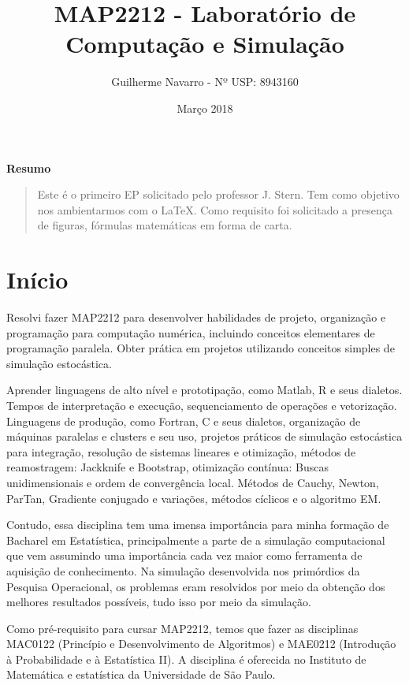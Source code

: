 \documentclass[12pt, a4paper]{article} %
\title{MAP2212 - Laboratório de Computação e Simulação}
\author{Guilherme Navarro - Nº USP: 8943160}
\date{Março 2018}
\begin{document}
\maketitle  %

\centerline{ \bf Resumo}

\begin{quote} %
Este é o primeiro EP solicitado pelo professor J. Stern. Tem como objetivo nos ambientarmos com o \LaTeX. Como requisito foi solicitado a presença de figuras, fórmulas matemáticas em forma de carta.
\end{quote}

\section {Início}

Resolvi fazer MAP2212 para desenvolver habilidades de projeto, organização e programação para computação numérica, incluindo conceitos elementares de programação paralela. Obter prática em projetos utilizando conceitos simples de simulação estocástica.

Aprender linguagens de alto nível e prototipação, como Matlab, R e seus dialetos. Tempos de interpretação e execução, sequenciamento de operações e vetorização. Linguagens de produção, como Fortran, C e seus dialetos, organização de máquinas paralelas e clusters e seu uso, projetos práticos de simulação estocástica para integração, resolução de sistemas lineares e otimização, métodos de reamostragem: Jackknife e Bootstrap, otimização contínua: Buscas unidimensionais e ordem de convergência local. Métodos de Cauchy, Newton, ParTan, Gradiente conjugado e variações, métodos cíclicos e o algoritmo EM.

Contudo, essa disciplina tem uma imensa importância para minha formação de Bacharel em Estatística, principalmente a parte de a simulação computacional que vem assumindo uma importância cada vez maior como ferramenta de aquisição de conhecimento. Na simulação desenvolvida nos primórdios da Pesquisa Operacional, os problemas eram resolvidos por meio da obtenção dos melhores resultados possíveis, tudo isso por meio da simulação.

Como pré-requisito para cursar MAP2212, temos que fazer as disciplinas MAC0122 (Princípio e Desenvolvimento de Algoritmos) e MAE0212 (Introdução à Probabilidade e à Estatística II). A disciplina é oferecida no Instituto de Matemática e estatística da Universidade de São Paulo.
\end{document}
